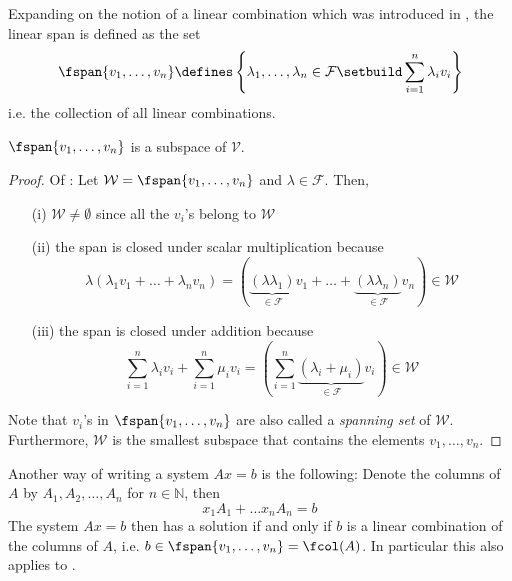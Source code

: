 \begin{definition}\label{def-linear-span}
	Expanding on the notion of a linear combination which was introduced in
	, the linear span is defined as
	the set
	\begin{equation}
		\fspan\{v_1, \dots, v_n\}\defines
		\left\{
		\lambda_1,\dots,\lambda_n\in\mathcal{F}\setbuild
		\sum_{i=1}^n \lambda_i v_i
		\right\}
	\end{equation}
	i.e. the collection of all linear combinations.
\end{definition}

\begin{thm}\label{thm-span-is-subspace}
	$\fspan\{v_1, \dots, v_n\}$ is a subspace of $\mathcal{V}$.
\end{thm}

\begin{proof}
	Of :
	Let  $\mathcal{W}=\fspan\{v_1, \dots, v_n\}$ and $\lambda\in\mathcal{F}$. Then,
	\begin{enumerate}
		\item[(i)] $\mathcal{W}\neq\emptyset$ since all the $v_i$'s belong to $\mathcal{W}$
		\item[(ii)] the span is closed under scalar multiplication because
			\begin{equation*}
				\lambda(\lambda_1 v_1+\dots+\lambda_n v_n)=\left(
				\underbrace{(\lambda\lambda_1)}_{\in\mathcal{F}} v_1+\dots+
				\underbrace{(\lambda\lambda_n)}_{\in\mathcal{F}} v_n
				\right)\in\mathcal{W}
			\end{equation*}
		\item[(iii)] the span is closed under addition because
			\begin{equation*}
				\sum_{i=1}^n \lambda_i v_i+\sum_{i=1}^n \mu_i v_i=
				\left(
				\sum_{i=1}^n \underbrace{(\lambda_i+\mu_i)}_{\in\mathcal{F}}v_i
				\right)\in\mathcal{W}
			\end{equation*}
	\end{enumerate}
	Note that $v_i$'s in $\fspan\{v_1, \dots, v_n\}$ are also called a \textit{spanning set}
	of $\mathcal{W}$. Furthermore, $\mathcal{W}$ is the smallest subspace that
	contains the elements $v_1, \dots, v_n$.
\end{proof}

\begin{exm}
	\begin{flushleft}
		Another way of writing a system $Ax=b$ is the following: Denote the
		columns of $A$ by $A_1, A_2, \dots, A_n$ for $n\in\mathbb{N}$, then
		\begin{equation*}
			x_1 A_1 + \dots x_n A_n = b
		\end{equation*}
		The system $Ax=b$ then has a solution if and only if $b$ is a linear
		combination of the columns of $A$, i.e. $b\in\fspan\{v_1,\dots,v_n\}=\fcol(A)$.
		In particular this also applies to .
	\end{flushleft}
\end{exm}

